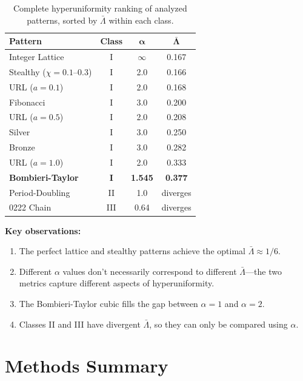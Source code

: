 \documentclass[11pt,letterpaper]{article}
\begin{document}
\begin{table}[H]
\centering
\begin{tabular}{lccc}
\toprule
\textbf{Pattern} & \textbf{Class} & $\boldsymbol{\alpha}$ & $\boldsymbol{\bar{\Lambda}}$ \\
\midrule
Integer Lattice & I & $\infty$ & 0.167 \\
Stealthy ($\chi=0.1$--$0.3$) & I & 2.0 & 0.166 \\
URL ($a=0.1$) & I & 2.0 & 0.168 \\
Fibonacci & I & 3.0 & 0.200 \\
URL ($a=0.5$) & I & 2.0 & 0.208 \\
Silver & I & 3.0 & 0.250 \\
Bronze & I & 3.0 & 0.282 \\
URL ($a=1.0$) & I & 2.0 & 0.333 \\
\textbf{Bombieri-Taylor} & \textbf{I} & \textbf{1.545} & \textbf{0.377} \\
\midrule
Period-Doubling & II & 1.0 & diverges \\
0222 Chain & III & 0.64 & diverges \\
\bottomrule
\end{tabular}
\caption{Complete hyperuniformity ranking of analyzed patterns, sorted by $\bar{\Lambda}$ within each class.}
\end{table}

\textbf{Key observations:}
\begin{enumerate}
    \item The perfect lattice and stealthy patterns achieve the optimal $\bar{\Lambda} \approx 1/6$.

    \item Different $\alpha$ values don't necessarily correspond to different $\bar{\Lambda}$---the two metrics capture different aspects of hyperuniformity.

    \item The Bombieri-Taylor cubic fills the gap between $\alpha = 1$ and $\alpha = 2$.

    \item Classes II and III have divergent $\bar{\Lambda}$, so they can only be compared using $\alpha$.
\end{enumerate}

\section{Methods Summary}
\end{document}
